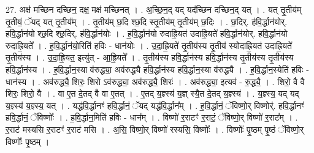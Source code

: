 \documentclass[17pt]{extarticle}
\begin{document}
27. अक्ष॑ मच्छिन दच्छिन॒ दक्ष॒ मक्ष॑ मच्छिनत् । . अ॒च्छि॒न॒द् यद् यद॑च्छिन दच्छिन॒द् यत् । . यत् तृ॒तीय॑म् तृ॒तीयं॒ ॅयद् यत् तृ॒तीय᳚म् । . तृ॒तीय॑म् छ॒दि श्छ॒दि स्तृ॒तीय॑म् तृ॒तीय॑म् छ॒दिः । . छ॒दिर्. ह॑वि॒र्द्धान॑योर्. हवि॒र्द्धान॑यो श्छ॒दि श्छ॒दिर्. ह॑वि॒र्द्धान॑योः । . ह॒वि॒र्द्धान॑यो रुदाह्रि॒यत॑ उदाह्रि॒यते॑ हवि॒र्द्धान॑योर्. हवि॒र्द्धान॑यो रुदाह्रि॒यते᳚ । . ह॒वि॒र्द्धान॑यो॒रिति॑ हविः - धान॑योः । . उ॒दा॒ह्रि॒यते॑ तृ॒तीय॑स्य तृ॒तीय॑ स्योदाह्रि॒यत॑ उदाह्रि॒यते॑ तृ॒तीय॑स्य । . उ॒दा॒ह्रि॒यत॒ इत्यु॑त् - आ॒ह्रि॒यते᳚ । . तृ॒तीय॑स्य हवि॒र्द्धान॑स्य हवि॒र्द्धान॑स्य तृ॒तीय॑स्य तृ॒तीय॑स्य हवि॒र्द्धान॑स्य । . ह॒वि॒र्द्धान॒स्या व॑रुद्ध्या॒ अव॑रुद्ध्यै हवि॒र्द्धान॑स्य हवि॒र्द्धान॒स्या व॑रुद्ध्यै । . ह॒वि॒र्द्धान॒स्येति॑ हविः - धान॑स्य । . अव॑रुद्ध्यै॒ शिरः॒ शिरो ऽव॑रुद्ध्या॒ अव॑रुद्ध्यै॒ शिरः॑ । . अव॑रुद्ध्या॒ इत्यव॑ - रु॒द्ध्यै॒ । . शिरो॒ वै वै शिरः॒ शिरो॒ वै । . वा ए॒त दे॒तद् वै वा ए॒तत् । . ए॒तद् य॒ज्ञ्स्य॑ य॒ज्ञ् स्यै॒त दे॒तद् य॒ज्ञ्स्य॑ । . य॒ज्ञ्स्य॒ यद् यद् य॒ज्ञ्स्य॑ य॒ज्ञ्स्य॒ यत् । . यद्ध॑वि॒र्द्धानꣳ॑ हवि॒र्द्धानं॒ ॅयद् यद्ध॑वि॒र्द्धान᳚म् । . ह॒वि॒र्द्धानं॒ ॅविष्णो॒र् विष्णोर्॑. हवि॒र्द्धानꣳ॑ हवि॒र्द्धानं॒ ॅविष्णोः᳚ । . ह॒वि॒र्द्धान॒मिति॑ हविः - धान᳚म् । . विष्णो॑ र॒राटꣳ॑ र॒राटं॒ ॅविष्णो॒र् विष्णो॑ र॒राट᳚म् । . र॒राट॑ मस्यसि र॒राटꣳ॑ र॒राट॑ मसि । . अ॒सि॒ विष्णो॒र् विष्णो॑ रस्यसि॒ विष्णोः᳚ । . विष्णोः᳚ पृ॒ष्ठम् पृ॒ष्ठं ॅविष्णो॒र् विष्णोः᳚ पृ॒ष्ठम् । \newline
\end{document}
